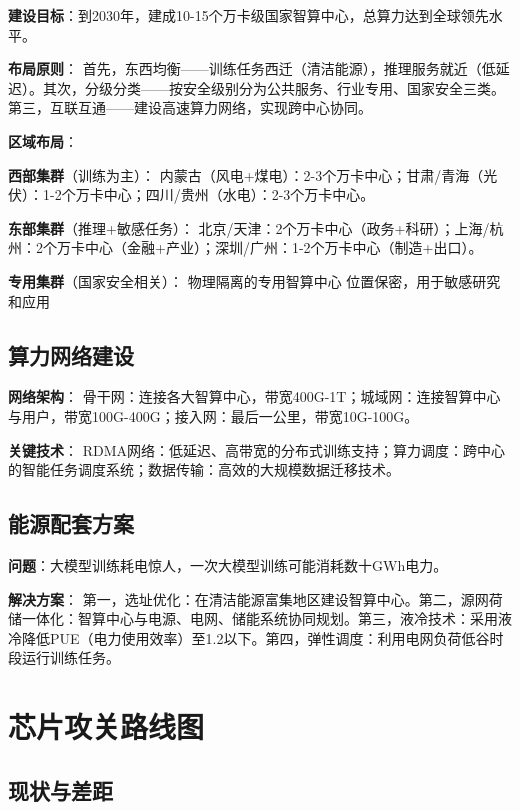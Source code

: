 \textbf{建设目标}：到2030年，建成10-15个万卡级国家智算中心，总算力达到全球领先水平。

\textbf{布局原则}：
首先，东西均衡——训练任务西迁（清洁能源），推理服务就近（低延迟）。其次，分级分类——按安全级别分为公共服务、行业专用、国家安全三类。第三，互联互通——建设高速算力网络，实现跨中心协同。

\textbf{区域布局}：

\textbf{西部集群}（训练为主）：
内蒙古（风电+煤电）：2-3个万卡中心；甘肃/青海（光伏）：1-2个万卡中心；四川/贵州（水电）：2-3个万卡中心。

\textbf{东部集群}（推理+敏感任务）：
北京/天津：2个万卡中心（政务+科研）；上海/杭州：2个万卡中心（金融+产业）；深圳/广州：1-2个万卡中心（制造+出口）。

\textbf{专用集群}（国家安全相关）：
物理隔离的专用智算中心 位置保密，用于敏感研究和应用

\subsection{算力网络建设}

\textbf{网络架构}：
骨干网：连接各大智算中心，带宽400G-1T；城域网：连接智算中心与用户，带宽100G-400G；接入网：最后一公里，带宽10G-100G。

\textbf{关键技术}：
RDMA网络：低延迟、高带宽的分布式训练支持；算力调度：跨中心的智能任务调度系统；数据传输：高效的大规模数据迁移技术。

\subsection{能源配套方案}

\textbf{问题}：大模型训练耗电惊人，一次大模型训练可能消耗数十GWh电力。

\textbf{解决方案}：
第一，选址优化：在清洁能源富集地区建设智算中心。第二，源网荷储一体化：智算中心与电源、电网、储能系统协同规划。第三，液冷技术：采用液冷降低PUE（电力使用效率）至1.2以下。第四，弹性调度：利用电网负荷低谷时段运行训练任务。

\section{芯片攻关路线图}

\subsection{现状与差距}

